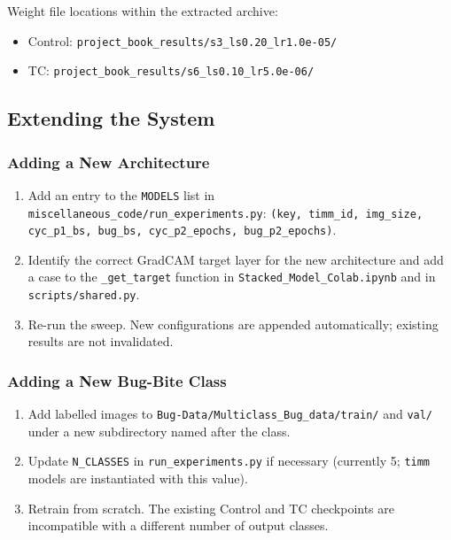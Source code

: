 \documentclass[12pt,a4paper]{article}
\begin{document}
Weight file locations within the extracted archive:
\begin{itemize}
    \item Control: \texttt{project\_book\_results/s3\_ls0.20\_lr1.0e-05/}
    \item TC: \texttt{project\_book\_results/s6\_ls0.10\_lr5.0e-06/}
\end{itemize}

\subsection{Extending the System}
\label{sec:pg-extend}

\subsubsection{Adding a New Architecture}

\begin{enumerate}
    \item Add an entry to the \texttt{MODELS} list in
          \texttt{miscellaneous\_code/run\_experiments.py}:
          \texttt{(key, timm\_id, img\_size, cyc\_p1\_bs, bug\_bs,
          cyc\_p2\_epochs, bug\_p2\_epochs)}.
    \item Identify the correct GradCAM target layer for the new architecture
          and add a case to the \texttt{\_get\_target} function in
          \texttt{Stacked\_Model\_Colab.ipynb} and in \texttt{scripts/shared.py}.
    \item Re-run the sweep. New configurations are appended automatically;
          existing results are not invalidated.
\end{enumerate}

\subsubsection{Adding a New Bug-Bite Class}

\begin{enumerate}
    \item Add labelled images to \texttt{Bug-Data/Multiclass\_Bug\_data/train/}
          and \texttt{val/} under a new subdirectory named after the class.
    \item Update \texttt{N\_CLASSES} in \texttt{run\_experiments.py} if
          necessary (currently 5; \texttt{timm} models are instantiated
          with this value).
    \item Retrain from scratch. The existing Control and TC checkpoints are
          incompatible with a different number of output classes.
\end{enumerate}
\end{document}
